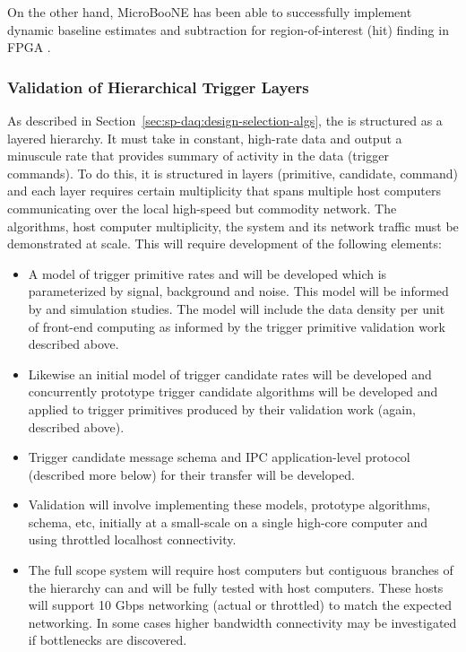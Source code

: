 On the other hand, MicroBooNE has been able to
successfully implement dynamic baseline estimates and subtraction
for region-of-interest (hit) finding in FPGA \cite{NNN18}.

\subsubsection{Validation of Hierarchical Trigger Layers}

As described in Section~\ref{sec:sp-daq:design-selection-algs}, the  is structured as a layered hierarchy. 
It must take in constant, high-rate data and output a minuscule rate that provides summary of activity in the data (trigger commands).
To do this, it is structured in layers (primitive, candidate, command) and each layer requires certain multiplicity that spans multiple host computers communicating over the local high-speed but commodity network. 
The algorithms, host computer multiplicity, the  system and its network traffic must be demonstrated at scale.
This will require development of the following elements:

\begin{itemize}
\item A model of trigger primitive rates and will be developed which is parameterized by signal, background and noise.  This model will be informed by  and simulation studies.  The model will include the data density per unit of front-end computing as informed by the trigger primitive validation work described above.
\item Likewise an initial model of trigger candidate rates will be developed and concurrently prototype trigger candidate algorithms will be developed and applied to trigger primitives produced by their validation work (again, described above).
\item Trigger candidate message schema and IPC application-level protocol (described more below) for their transfer will be developed.
\item Validation will involve implementing these models, prototype algorithms, schema, etc,  initially at a small-scale on a single high-core computer and using throttled localhost connectivity.
\item The full scope system will require  host computers but contiguous branches of the hierarchy can and will be fully tested with  host computers. 
  These hosts will support 10 Gbps networking (actual or throttled) to match the expected networking. 
  In some cases higher bandwidth connectivity may be investigated if bottlenecks are discovered. 
\end{itemize}



